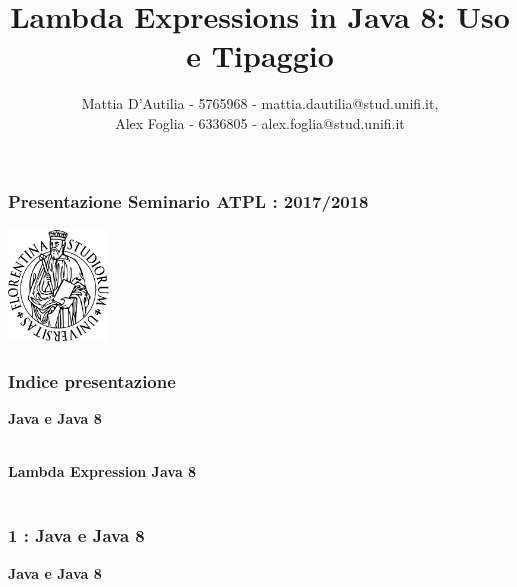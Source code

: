 \documentclass{beamer}
\title[Lambda in Java 8]{Lambda Expressions in Java 8: Uso e Tipaggio}
\author[]{Mattia D'Autilia - 5765968 - mattia.dautilia@stud.unifi.it,\\ Alex Foglia - 6336805 - alex.foglia@stud.unifi.it}
\date{}
\begin{document}

\begin{frame}
	\frametitle{\textbf{Presentazione Seminario ATPL : 2017/2018}}
	\begin{center}
  		\includegraphics[width=0.2\textwidth]{assets/logo-unifi.png}
  	\end{center}
	\titlepage 
\end{frame}


\begin{frame}
	\frametitle{\textbf{Indice presentazione}}
	\begin{enumerate}
	\end{enumerate}
\end{frame}


\begin{frame}
	\frametitle{\textbf{1 : Java e Java 8}}
	\begin{center}
		\textbf{\Huge Java e Java 8}
	\end{center}
\end{frame}

\end{document}
